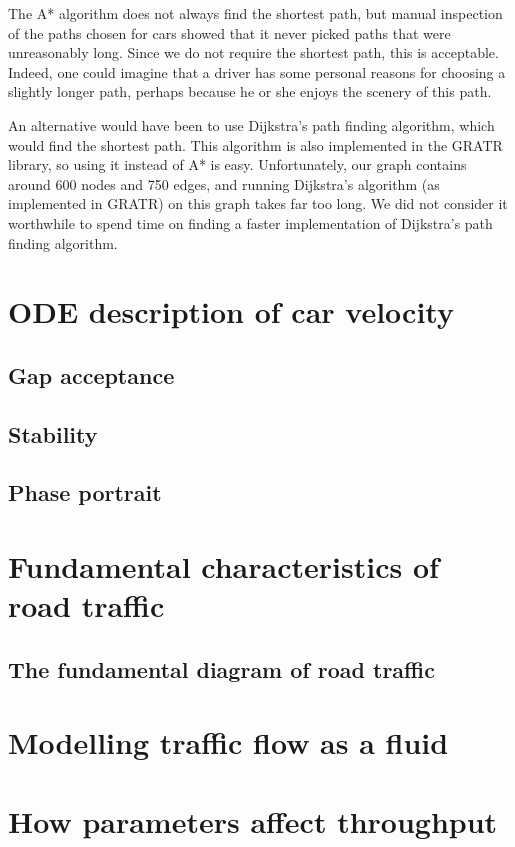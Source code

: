\documentclass[11pt,a4paper]{article}
\begin{document}
The A* algorithm does not always find the shortest path, but manual inspection
of the paths chosen for cars showed that it never picked paths that were
unreasonably long. Since we do not require the shortest path, this is
acceptable. Indeed, one could imagine that a driver has some personal reasons
for choosing a slightly longer path, perhaps because he or she enjoys the
scenery of this path.

An alternative would have been to use Dijkstra's path finding algorithm, which
would find the shortest path. This algorithm is also implemented in the GRATR
library, so using it instead of A* is easy. Unfortunately, our graph contains
around 600 nodes and 750 edges, and running Dijkstra's algorithm (as implemented
in GRATR) on this graph takes far too long. We did not consider it worthwhile
to spend time on finding a faster implementation of Dijkstra's path finding
algorithm.

\section{ODE description of car velocity}
\subsection{Gap acceptance}
\subsection{Stability}
\subsection{Phase portrait}

\section{Fundamental characteristics of road traffic}
\subsection{The fundamental diagram of road traffic}

\section{Modelling traffic flow as a fluid}

\section{How parameters affect throughput}
\end{document}
